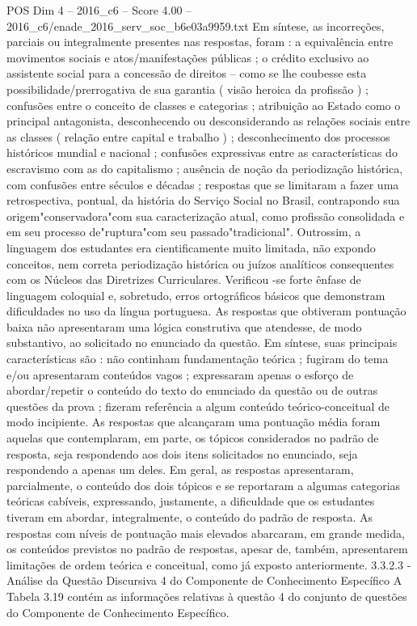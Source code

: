 \begin{textsample}{POS Dim 4 – 2016\_c6 – Score 4.00 – 2016\_c6/enade\_2016\_serv\_soc\_b6e03a9959.txt}
Em síntese, as incorreções, parciais ou integralmente presentes nas respostas, foram : a equivalência entre movimentos sociais e atos/manifestações públicas ; o crédito exclusivo ao assistente social para a concessão de direitos – como se lhe coubesse esta possibilidade/prerrogativa de sua garantia ( visão heroica da profissão ) ; confusões entre o conceito de classes e categorias ; atribuição ao Estado como o principal antagonista, desconhecendo ou desconsiderando as relações sociais entre as classes ( relação entre capital e trabalho ) ; desconhecimento dos processos históricos mundial e nacional ; confusões expressivas entre as características do escravismo com as do capitalismo ; ausência de noção da periodização histórica, com confusões entre séculos e décadas ; respostas que se limitaram a fazer uma retrospectiva, pontual, da história do Serviço Social no Brasil, contrapondo sua origem"conservadora"com sua caracterização atual, como profissão consolidada e em seu processo de"ruptura"com seu passado"tradicional".
Outrossim, a linguagem dos estudantes era cientificamente muito limitada, não expondo conceitos, nem correta periodização histórica ou juízos analíticos consequentes com os Núcleos das Diretrizes Curriculares.
Verificou -se forte ênfase de linguagem coloquial e, sobretudo, erros ortográficos básicos que demonstram dificuldades no uso da língua portuguesa.
As respostas que obtiveram pontuação baixa não apresentaram uma lógica construtiva que atendesse, de modo substantivo, ao solicitado no enunciado da questão.
Em síntese, suas principais características são : não continham fundamentação teórica ; fugiram do tema e/ou apresentaram conteúdos vagos ; expressaram apenas o esforço de abordar/repetir o conteúdo do texto do enunciado da questão ou de outras questões da prova ; fizeram referência a algum conteúdo teórico-conceitual de modo incipiente.
As respostas que alcançaram uma pontuação média foram aquelas que contemplaram, em parte, os tópicos considerados no padrão de resposta, seja respondendo aos dois itens solicitados no enunciado, seja respondendo a apenas um deles.
Em geral, as respostas apresentaram, parcialmente, o conteúdo dos dois tópicos e se reportaram a algumas categorias teóricas cabíveis, expressando, justamente, a dificuldade que os estudantes tiveram em abordar, integralmente, o conteúdo do padrão de resposta.
As respostas com níveis de pontuação mais elevados abarcaram, em grande medida, os conteúdos previstos no padrão de respostas, apesar de, também, apresentarem limitações de ordem teórica e conceitual, como já exposto anteriormente. 3.3.2.3 - Análise da Questão Discursiva 4 do Componente de Conhecimento Específico A Tabela 3.19 contém as informações relativas à questão 4 do conjunto de questões do Componente de Conhecimento Específico.

\end{textsample}
